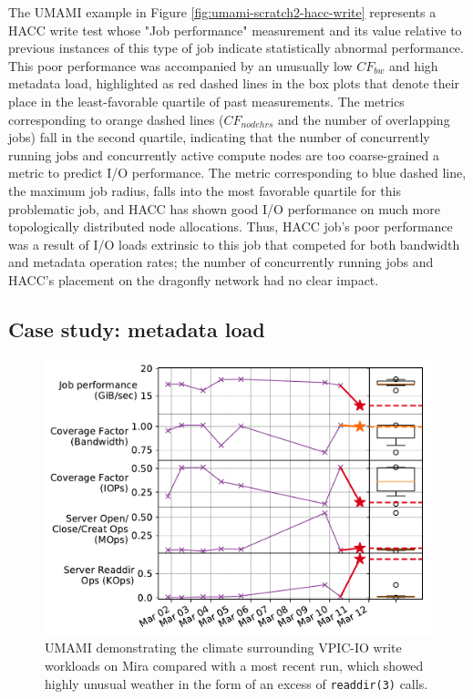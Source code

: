 The UMAMI example in Figure \ref{fig:umami-scratch2-hacc-write} represents a HACC write test whose "Job performance" measurement and its value relative to previous instances of this type of job indicate statistically abnormal performance.
This poor performance was accompanied by an unusually low $\mathit{CF}_{\mathit{bw}}$ and high metadata load, highlighted as red dashed lines in the box plots that denote their place in the least-favorable quartile of past measurements.
The metrics corresponding to orange dashed lines ($\mathit{CF}_{\mathit{nodehrs}}$ and the number of overlapping jobs) fall in the second quartile, indicating that the number of concurrently running jobs and concurrently active compute nodes are too coarse-grained a metric to predict I/O performance.
The metric corresponding to blue dashed line, the maximum job radius, falls into the most favorable quartile for this problematic job, and HACC has shown good I/O performance on much more topologically distributed node allocations.
Thus, HACC job's poor performance was a result of I/O loads extrinsic to this job that competed for both bandwidth and metadata operation rates; the number of concurrently running jobs and HACC's placement on the dragonfly network had no clear impact.

\subsection{Case study: metadata load}

\begin{figure}[t]
    \centering
    \includegraphics[width=1.0\columnwidth]{figs/umami-mira-fs1-vpic-write.pdf}
    \vspace{-.25in}
    \caption{UMAMI demonstrating the climate surrounding VPIC-IO write workloads on Mira compared with a most recent run, which showed highly unusual weather in the form of an excess of \texttt{readdir(3)} calls.
    }
    \label{fig:umami-mira-fs1-vpic-write}
	\vspace{-.15in}
\end{figure}

